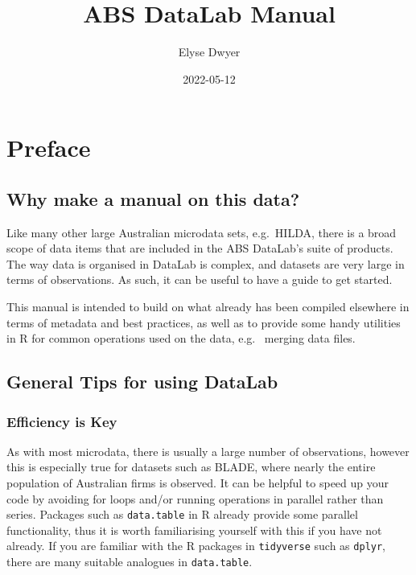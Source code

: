 \documentclass[
]{book}
\title{ABS DataLab Manual}
\author{Elyse Dwyer}
\date{2022-05-12}
\begin{document}
\maketitle

{
\setcounter{tocdepth}{1}
\tableofcontents
}
\hypertarget{preface}{%
\chapter{Preface}\label{preface}}

\hypertarget{why-make-a-manual-on-this-data}{%
\section{Why make a manual on this data?}\label{why-make-a-manual-on-this-data}}

Like many other large Australian microdata sets, e.g.~HILDA, there is a broad scope of
data items that are included in the ABS DataLab's suite of products. The way data is organised in DataLab is complex, and datasets are very large in terms of observations. As such, it can be useful to have a guide to get started.

This manual is intended to build on what already has been compiled elsewhere in terms of metadata and
best practices, as well as to provide some handy utilities in R for common operations used on the data, e.g.~
merging data files.

\hypertarget{general-tips-for-using-datalab}{%
\section{General Tips for using DataLab}\label{general-tips-for-using-datalab}}

\hypertarget{efficiency-is-key}{%
\subsection{Efficiency is Key}\label{efficiency-is-key}}

As with most microdata, there is usually a large number of observations, however this is especially true for datasets such as BLADE, where nearly the entire population of Australian firms is observed. It can be helpful to speed up your code by avoiding for loops and/or running operations in parallel rather than series. Packages such as \texttt{data.table} in R already provide some parallel functionality, thus it is worth familiarising yourself with this if you have not already. If you are familiar with the R packages in \texttt{tidyverse} such as \texttt{dplyr}, there are many suitable analogues in \texttt{data.table}.
\end{document}
